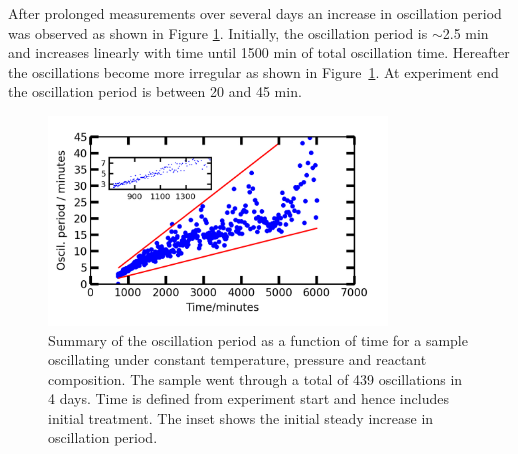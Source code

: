 \documentclass[8.5pt,twoside,twocolumn]{article}
\begin{document}
After prolonged measurements over several days an increase in oscillation period was observed as shown in Figure \ref{fgr:long_measurement}. Initially, the oscillation period is $\sim$2.5 min and increases linearly with time until 1500 min of total oscillation time. Hereafter the oscillations become more irregular as shown in Figure~\ref{fgr:long_measurement}. At experiment end the oscillation period is between 20 and 45 min.
\begin{figure}[h]
\centering
  \includegraphics[width=9cm]{summary_of_long_measurement.png}
  \caption{Summary of the oscillation period as a function of time for a sample oscillating under constant temperature, pressure and reactant composition. The sample went through a total of 439 oscillations in 4 days. Time is defined from experiment start and hence includes initial treatment. The inset shows the initial steady increase in oscillation period.}
  \label{fgr:long_measurement}
\end{figure}
  
\end{document}
